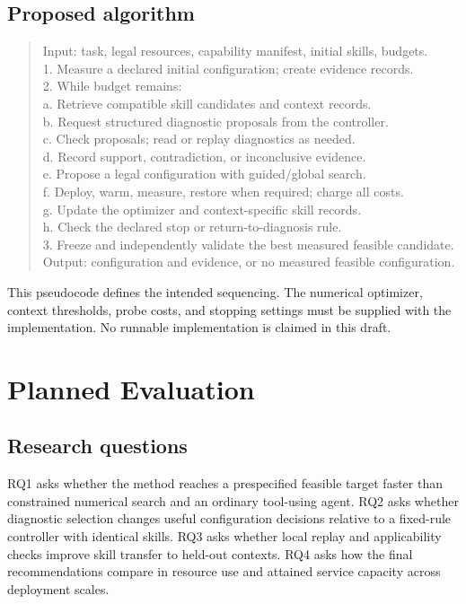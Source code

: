 \documentclass[11pt,a4paper]{article}
\begin{document}
\subsection{Proposed algorithm}
\begin{quote}\small\ttfamily
Input: task, legal resources, capability manifest, initial skills, budgets.\\
1. Measure a declared initial configuration; create evidence records.\\
2. While budget remains:\\
\hspace*{1em}a. Retrieve compatible skill candidates and context records.\\
\hspace*{1em}b. Request structured diagnostic proposals from the controller.\\
\hspace*{1em}c. Check proposals; read or replay diagnostics as needed.\\
\hspace*{1em}d. Record support, contradiction, or inconclusive evidence.\\
\hspace*{1em}e. Propose a legal configuration with guided/global search.\\
\hspace*{1em}f. Deploy, warm, measure, restore when required; charge all costs.\\
\hspace*{1em}g. Update the optimizer and context-specific skill records.\\
\hspace*{1em}h. Check the declared stop or return-to-diagnosis rule.\\
3. Freeze and independently validate the best measured feasible candidate.\\
Output: configuration and evidence, or no measured feasible configuration.
\end{quote}
This pseudocode defines the intended sequencing. The numerical optimizer, context thresholds, probe costs, and stopping settings must be supplied with the implementation. No runnable implementation is claimed in this draft.

\section{Planned Evaluation}
\subsection{Research questions}
RQ1 asks whether the method reaches a prespecified feasible target faster than constrained numerical search and an ordinary tool-using agent. RQ2 asks whether diagnostic selection changes useful configuration decisions relative to a fixed-rule controller with identical skills. RQ3 asks whether local replay and applicability checks improve skill transfer to held-out contexts. RQ4 asks how the final recommendations compare in resource use and attained service capacity across deployment scales.
\end{document}
